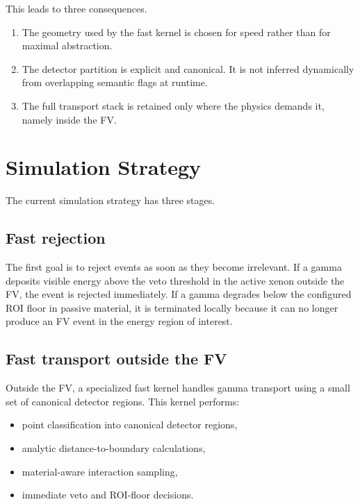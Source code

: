 \documentclass[11pt]{article}
\begin{document}
This leads to three consequences.

\begin{enumerate}[label=\arabic*.]
\item The geometry used by the fast kernel is chosen for speed rather than for
maximal abstraction.

\item The detector partition is explicit and canonical. It is not inferred
dynamically from overlapping semantic flags at runtime.

\item The full transport stack is retained only where the physics demands it,
namely inside the FV.
\end{enumerate}

\section{Simulation Strategy}

The current simulation strategy has three stages.

\subsection{Fast rejection}

The first goal is to reject events as soon as they become irrelevant. If a gamma
deposits visible energy above the veto threshold in the active xenon outside the
FV, the event is rejected immediately. If a gamma degrades below the configured
ROI floor in passive material, it is terminated locally because it can no longer
produce an FV event in the energy region of interest.

\subsection{Fast transport outside the FV}

Outside the FV, a specialized fast kernel handles gamma transport using a small
set of canonical detector regions. This kernel performs:

\begin{itemize}
\item point classification into canonical detector regions,
\item analytic distance-to-boundary calculations,
\item material-aware interaction sampling,
\item immediate veto and ROI-floor decisions.
\end{itemize}
\end{document}
